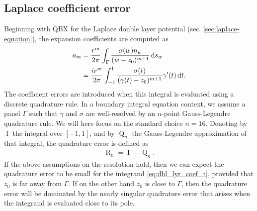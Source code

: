 \documentclass[hidelinks]{siamart1116}
\begin{document}
\subsection{Laplace coefficient error}
Beginning with QBX for the Laplace double layer potential
(sec. \ref{sec:laplace-equation}), the expansion coefficients are
computed as
\begin{align}
  {a}_m 
  &= \frac{r^m}{2\pi} \int_\Gamma \frac{{\sigma}(w) n_w}{(w-z_0)^{m+1}} \dif s_w \label{eq:dbl_lyr_coef} \\
  &= \frac{ir^m}{2\pi} \int_{-1}^1 \frac{{{\sigma}}(t)}{({\gamma}(t)-z_0)^{m+1}} {\gamma}'(t) \dif t .
    \label{eq:dbl_lyr_coef_t}
\end{align}
The coefficient errors are introduced when this integral is evaluated
using a discrete quadrature rule. In a boundary integral equation
context, we assume a panel $\Gamma$ such that ${\gamma}$ and
${{\sigma}}$ are well-resolved by an $n$-point Gauss-Legendre
quadrature rule. We will here focus on the standard choice
$n=16$. Denoting by ${\operatorname{I}}$ the integral over $[-1, 1]$, and by
${{\operatorname{Q}}_{n}}$ the Gauss-Legendre approximation of that integral, the
quadrature error is defined as
\begin{align}
  {\operatorname{R}_{n}} = {\operatorname{I}} - {{\operatorname{Q}}_{n}}.
  \label{eq:oprem}
\end{align}
If the above assumptions on the resolution hold, then we can expect
the quadrature error to be small for the integrand
\eqref{eq:dbl_lyr_coef_t}, provided that $z_0$ is far away from
$\Gamma$. If on the other hand $z_0$ is close to $\Gamma$, then the
quadrature error will be dominated by the nearly singular quadrature
error that arises when the integrand is evaluated close to its
pole.
\end{document}
